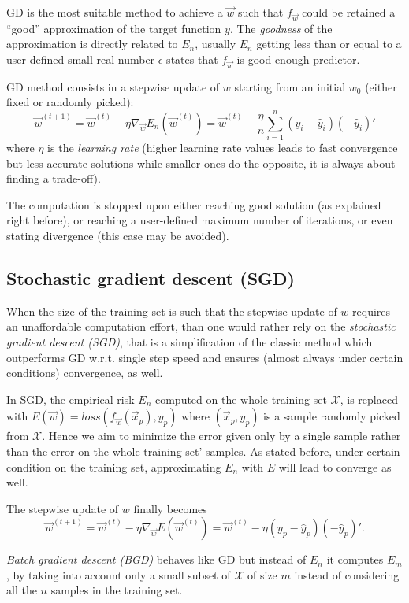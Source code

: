 \documentclass[a4paper,12pt]{article}
\theoremstyle{newplanestyle}
\theoremstyle{newdefinitionstyle}
\theoremstyle{newprovestyle}
\begin{document}
GD is the most suitable method to achieve a $\vec{w}$ such that $f_{\vec{w}}$ could be retained a ``good'' approximation of the target function $y$. The \textit{goodness} of the approximation is directly related to $E_n$, usually $E_n$ getting less than or equal to a user-defined small real number $\epsilon$ states that $f_{\vec{w}}$ is good enough predictor.

GD method consists in a stepwise update of $w$ starting from an initial $w_0$ (either fixed or randomly picked):
\begin{equation*}
\vec{w}^{(t+1)} = \vec{w}^{(t)}-\eta \nabla_{\vec{w}} E_n(\vec{w}^{(t)})
= \vec{w}^{(t)} - \frac{\eta}{n} \sum_{i=1}^{n}(y_i - \hat{y}_i)(-\hat{y}_i)'
\end{equation*}
where $\eta$ is the \textit{learning rate} (higher learning rate values leads to fast convergence but less accurate solutions while smaller ones do the opposite, it is always about finding a trade-off).

The computation is stopped upon either reaching good solution (as explained right before), or reaching a user-defined maximum number of iterations, or even stating divergence (this case may be avoided).

\subsection*{Stochastic gradient descent (SGD)}
When the size of the training set is such that the stepwise update of $w$ requires an unaffordable computation effort, than one would rather rely on the \textit{stochastic gradient descent (SGD)}, that is a simplification of the classic method which outperforms GD w.r.t. single step speed and ensures (almost always under certain conditions) convergence, as well.

In SGD, the empirical risk $E_n$ computed on the whole training set $\mathcal{X}$, is replaced with $E(\vec{w})=loss(f_{\vec{w}}(\vec{x}_p),y_p)$ where $(\vec{x}_p, y_p)$ is a sample randomly picked from $\mathcal{X}$. Hence we aim to minimize the error given only by a single sample rather than the error on the whole training set' samples. As stated before, under certain condition on the training set, approximating $E_n$ with $E$ will lead to converge as well.

The stepwise update of $w$ finally becomes
\[
\vec{w}^{(t+1)}=\vec{w}^{(t)}-\eta \nabla_{\vec{w}} E(\vec{w}^{(t)})=\vec{w}^{(t)}-\eta(y_p - \hat{y}_p)(-\hat{y}_p)'.
\]

\textit{Batch gradient descent (BGD)} behaves like GD but instead of $E_n$ it computes $E_m$, by taking into account only a small subset of $\mathcal{X}$ of size $m$ instead of considering all the $n$ samples in the training set.
\end{document}

